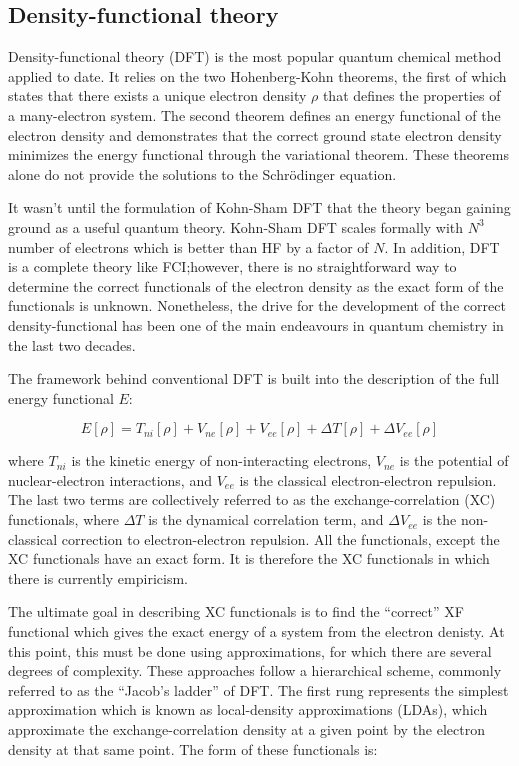 \subsection{Density-functional theory}

Density-functional theory (DFT) is the most popular quantum chemical method
applied to date. It relies on the two Hohenberg-Kohn theorems, the first of
which states that there exists a unique electron density $\rho$ that defines
the properties of a many-electron system. The second theorem defines an energy
functional of the electron density and demonstrates that the correct ground
state electron density minimizes the energy functional through the variational
theorem.\cite{Hohenberg1964,Koch2000} These theorems alone do not provide the
solutions to the Schr{\"o}dinger equation.

It wasn't until the formulation of Kohn-Sham DFT\cite{Kohn1965} that the theory
began gaining ground as a useful quantum theory. Kohn-Sham DFT scales formally
with $N^3$ number of electrons\cite{Cramer2004} which is better than HF by a
factor of $N$. In addition, DFT is a complete theory like FCI;\@ however, there
is no straightforward way to determine the correct functionals of the electron
density as the exact form of the functionals is unknown. Nonetheless, the drive
for the development of the correct density-functional has been one of the main
endeavours in quantum chemistry in the last two decades.

The framework behind conventional DFT is built into the description of the full
energy functional $E$:

\begin{equation}
  E[\rho] = T_{ni}[\rho] + V_{ne}[\rho] + V_{ee}[\rho] + \Delta T[\rho] + \Delta V_{ee}[\rho]
\label{eq:DFT}
\end{equation}

\noindent where $T_{ni}$ is the kinetic energy of non-interacting electrons,
$V_{ne}$ is the potential of nuclear-electron interactions, and $V_{ee}$ is the
classical electron-electron repulsion. The last two terms are collectively
referred to as the exchange-correlation (XC) functionals, where $\Delta T$ is
the dynamical correlation term, and $\Delta V_{ee}$ is the non-classical
correction to electron-electron repulsion. All the functionals, except the XC
functionals have an exact form. It is therefore the XC functionals in which
there is currently empiricism.

The ultimate goal in describing XC functionals is to find the ``correct'' XF
functional which gives the exact energy of a system from the electron denisty.
At this point, this must be done using approximations, for which there are
several degrees of complexity. These approaches follow a hierarchical scheme,
commonly referred to as the ``Jacob's ladder'' of DFT.\cite{Perdew2005} The
first rung represents the simplest approximation which is known as
local-density approximations (LDAs), which approximate the exchange-correlation
density at a given point by the electron density at that same point. The form
of these functionals is:

